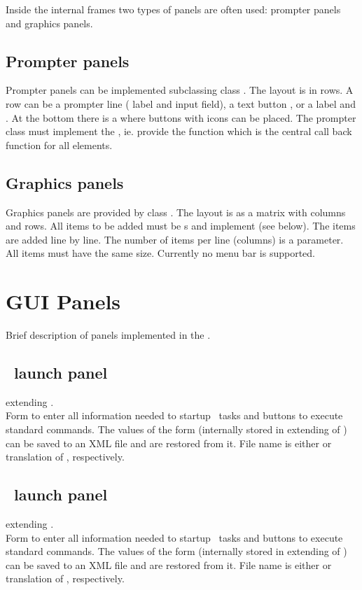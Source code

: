 Inside the internal frames two types of panels are often used: prompter panels and
graphics panels.
\subsection{Prompter panels}
Prompter panels can be implemented subclassing class .
The layout is in rows. A row can be a prompter line ( label and  input field),
a text button , or a  label and . At the bottom there is a 
where buttons with icons can be placed. The prompter class must implement the 
, ie. provide the  function which is
the central call back function for all elements.
\subsection{Graphics panels}
Graphics panels are provided by class .
The layout is as a matrix with columns and rows. All items to be added 
must be s and implement  (see below).
The items are added line by line. The number of items per line (columns)
is a parameter. All items must have the same size.
Currently no menu bar is supported.
\section{GUI Panels}
Brief description of panels implemented in the \gui.
\subsection{\dabc\ launch panel}
 extending .\\
Form to enter all information needed to startup \dabc\ tasks and
buttons to execute standard commands.
The values of the form (internally stored in  extending of )
can be saved to an XML file and are restored from it. File name is either
 or translation of , respectively.
\subsection{\mbs\ launch panel}
 extending .\\
Form to enter all information needed to startup \mbs\ tasks and
buttons to execute standard commands.
The values of the form (internally stored in  extending of )
can be saved to an XML file and are restored from it. File name is either
 or translation of , respectively.
